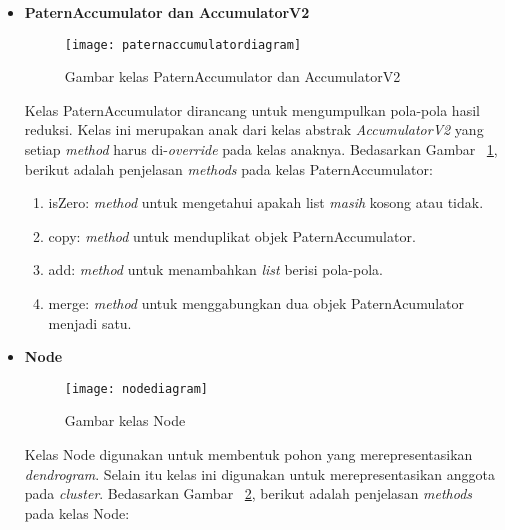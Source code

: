 \begin{itemize}
\begin{enumerate}
\end{enumerate}



\item \textbf{PaternAccumulator dan AccumulatorV2}\\

\begin{figure}[H]
    \centering  
    \texttt{[image: paternaccumulatordiagram]}  
    \caption[Gambar kelas PaternAccumulator dan AccumulatorV2]{Gambar kelas PaternAccumulator dan AccumulatorV2} 
    \label{fig:paternaccumulatordiagram} 
\end{figure}

Kelas PaternAccumulator dirancang untuk mengumpulkan pola-pola hasil reduksi. Kelas ini merupakan anak dari kelas abstrak \textit{AccumulatorV2} yang setiap \textit{method} harus di-\textit{override} pada kelas anaknya.  Bedasarkan Gambar ~\ref{fig:paternaccumulatordiagram}, berikut adalah penjelasan \textit{methods} pada kelas PaternAccumulator:

\begin{enumerate}

\item isZero: \textit{method} untuk mengetahui apakah list \textit{masih} kosong atau tidak.

\item copy: \textit{method} untuk menduplikat objek PaternAccumulator.

\item add: \textit{method} untuk menambahkan \textit{list} berisi pola-pola.

\item merge: \textit{method} untuk menggabungkan dua objek PaternAcumulator menjadi satu.\\

\end{enumerate}


\item \textbf{Node}\\

\begin{figure}[H]
    \centering  
    \texttt{[image: nodediagram]}  
    \caption[Gambar kelas Node]{Gambar kelas Node} 
    \label{fig:nodediagram} 
\end{figure}

Kelas Node digunakan untuk membentuk pohon yang merepresentasikan \textit{dendrogram}. Selain itu kelas ini digunakan untuk merepresentasikan anggota pada \textit{cluster}.  Bedasarkan Gambar ~\ref{fig:nodediagram}, berikut adalah penjelasan \textit{methods} pada kelas Node:


\end{itemize}

